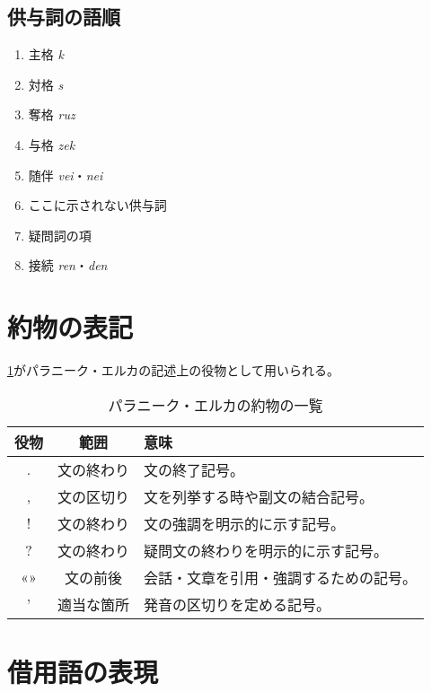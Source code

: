 \subsection{供与詞の語順}

\begin{multicols}{2}
    \begin{enumerate}
        \item 主格 \emph{k}
        \item 対格 \emph{s}
        \item 奪格 \emph{ruz}
        \item 与格 \emph{zek}
        \columnbreak
        \item 随伴 \emph{vei}・\emph{nei}
        \item ここに示されない供与詞
        \item 疑問詞の項
        \item 接続 \emph{ren}・\emph{den}
    \end{enumerate}
\end{multicols}

\section{約物の表記}

\cref{table:list-of-punctuation}がパラニーク・エルカの記述上の役物として用いられる。

\begin{table}[H]
    \centering
    \caption{パラニーク・エルカの約物の一覧}
    \label{table:list-of-punctuation}
    \begin{tabular}{ccl}
        \toprule
        役物 & 範囲 & 意味 \\
        \midrule
        .  & 文の終わり & 文の終了記号。 \\
        ,  & 文の区切り & 文を列挙する時や副文の結合記号。 \\
        !  & 文の終わり & 文の強調を明示的に示す記号。 \\
        ?  & 文の終わり & 疑問文の終わりを明示的に示す記号。 \\
        «» & 文の前後  & 会話・文章を引用・強調するための記号。 \\
        '  & 適当な箇所 & 発音の区切りを定める記号。 \\
        \bottomrule
    \end{tabular}
\end{table}

\section{借用語の表現}

